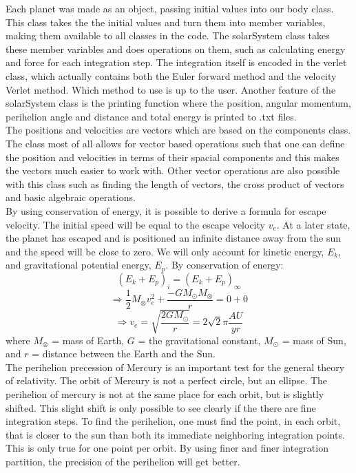 \documentclass[10pt,a4paper]{article}
\begin{document}
\noindent Each planet was made as an object, passing initial values into our body class. This class takes the the initial values and turn them into member variables, making them available to all classes in the code. The solarSystem class takes these member variables and does operations on them, such as calculating energy and force for each integration step. The integration itself is encoded in the verlet class, which actually contains both the Euler forward method and the velocity Verlet method. Which method to use is up to the user. Another feature of the solarSystem class is the printing function where the position, angular momentum, perihelion angle and distance and total energy is printed to .txt files.\\


\noindent The positions and velocities are vectors which are based on the components class. The class most of all allows for vector based operations such that one can define the position and velocities in terms of their spacial components and this makes the vectors much easier to work with. Other vector operations are also possible with this class such as finding the length of vectors, the cross product of vectors and basic algebraic operations.\\

\noindent By using conservation of energy, it is possible to derive a formula for escape velocity. The initial speed will be equal to the escape velocity $v_e$. At a later state, the planet has escaped and is positioned an infinite distance away from the sun and the speed will be close to zero. We will only account for kinetic energy, $E_k$, and gravitational potential energy, $E_p$. By conservation of energy: 
$$(E_k+E_p)_i = (E_k+E_p)_{\infty}$$
$$\Rightarrow \frac{1}{2}M_{\otimes}v_e^2 + \frac{-GM_{\odot}M_{\otimes}}{r} = 0 + 0$$
$$\Rightarrow v_e = \sqrt{\frac{2GM_{\odot}}{r}} = 2\sqrt{2}\pi \frac{AU}{yr}$$
where $M_{\otimes}$ = mass of Earth, $G$ = the gravitational constant, $M_{\odot}$ = mass of Sun, and $r$ = distance between the Earth and the Sun.\\


\noindent The perihelion precession of Mercury is an important test for the general theory of relativity. The orbit of Mercury is not a perfect circle, but an ellipse. The perihelion of mercury is not at the same place for each orbit, but is slightly shifted. This slight shift is only possible to see clearly if the there are fine integration steps. To find the perihelion, one must find the point, in each orbit, that is closer to the sun than both its immediate neighboring integration points. This is only true for one point per orbit. By using finer and finer integration partition, the precision of the perihelion will get better. \\  
\end{document}

